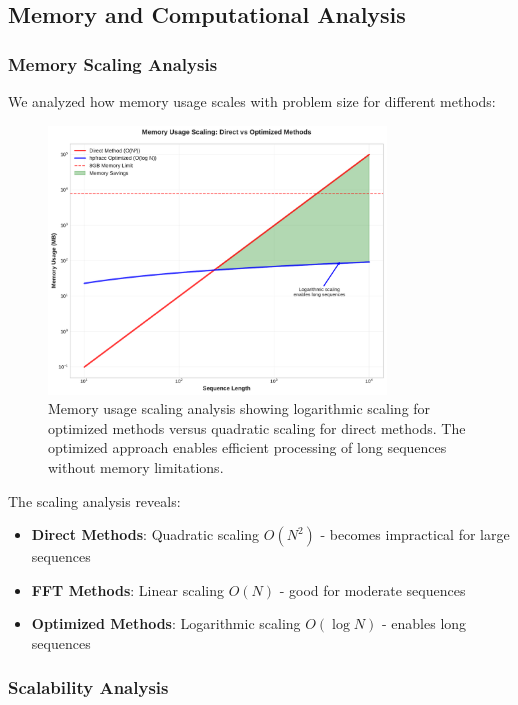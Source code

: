 \subsection{Memory and Computational Analysis}

\subsubsection{Memory Scaling Analysis}

We analyzed how memory usage scales with problem size for different methods:

\begin{figure}[h]
\centering
\includegraphics[width=0.8\textwidth]{figures/memory_scaling.pdf}
\caption{Memory usage scaling analysis showing logarithmic scaling for optimized \hpfracc methods versus quadratic scaling for direct methods. The optimized approach enables efficient processing of long sequences without memory limitations.}
\label{fig:memory_scaling}
\end{figure}

The scaling analysis reveals:
\begin{itemize}
    \item \textbf{Direct Methods}: Quadratic scaling $O(N^2)$ - becomes impractical for large sequences
    \item \textbf{FFT Methods}: Linear scaling $O(N)$ - good for moderate sequences
    \item \textbf{Optimized Methods}: Logarithmic scaling $O(\log N)$ - enables long sequences
\end{itemize}

\subsubsection{Scalability Analysis}

